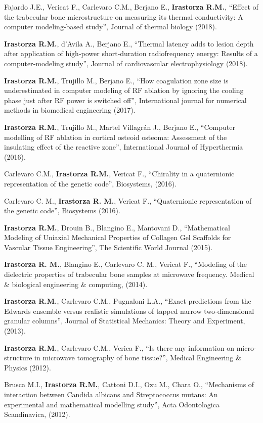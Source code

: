 \documentclass[margin,line]{res}
\begin{document}
\begin{resume}
Fajardo J.E., Vericat F., Carlevaro C.M., Berjano E., \textbf{Irastorza R.M.}, ``Effect of the trabecular bone microstructure on measuring its thermal conductivity: A computer modeling-based study'', Journal of thermal biology (2018).

\textbf{Irastorza R.M.}, d'Avila A., Berjano E., ``Thermal latency adds to lesion depth after application of high‐power short‐duration radiofrequency energy: Results of a computer‐modeling study'', Journal of cardiovascular electrophysiology (2018).

\textbf{Irastorza R.M.}, Trujillo M., Berjano E., ``How coagulation zone size is underestimated in computer modeling of RF ablation by ignoring the cooling phase just after RF power is switched off'', International journal for numerical methods in biomedical engineering (2017).

\textbf{Irastorza R.M.}, Trujillo M., Martel Villagrán J., Berjano E., ``Computer modelling of RF ablation in cortical osteoid osteoma: Assessment of the insulating effect of the reactive zone'', International Journal of Hyperthermia (2016).

Carlevaro C.M., {\bf Irastorza R.M.}, Vericat F., ``Chirality in a quaternionic representation of the genetic code'', Biosystems, (2016).

Carlevaro C. M., \textbf{Irastorza R. M.}, Vericat F., ``Quaternionic representation of the genetic code'', Biosystems (2016).

\textbf{Irastorza R.M.}, Drouin B., Blangino E., Mantovani D., ``Mathematical Modeling of Uniaxial Mechanical Properties of Collagen Gel Scaffolds for Vascular Tissue Engineering'', The Scientific World Journal (2015).

\textbf{Irastorza R. M.}, Blangino E., Carlevaro C. M., Vericat F., ``Modeling of the dielectric properties of trabecular bone samples at microwave frequency. Medical \& biological engineering \& computing, (2014).

\textbf{Irastorza R.M.}, Carlevaro C.M., Pugnaloni L.A., ``Exact predictions from the Edwards ensemble versus realistic simulations of tapped narrow two-dimensional granular columns'', Journal of Statistical Mechanics: Theory and Experiment, (2013).

\textbf{Irastorza R.M.}, Carlevaro C.M., Verica F., ``Is there any information on micro-structure in microwave tomography of bone tissue?'', Medical Engineering \& Physics (2012).

Brusca M.I., {\bf Irastorza R.M.}, Cattoni D.I., Ozu M., Chara O., ``Mechanisms of interaction between Candida albicans and Streptococcus mutans: An experimental and mathematical modelling study'', Acta Odontologica Scandinavica, (2012).


\end{resume}
\end{document}
